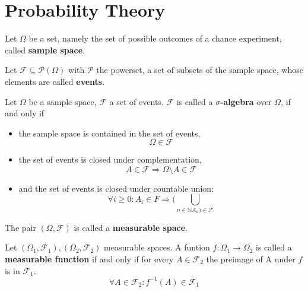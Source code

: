    \section{Probability Theory}\label{\positionnumber}
        \begin{definition}
        Let $\Omega$ be a set, namely the set of possible outcomes of a chance experiment, called \textbf{sample space}.
        
        Let $\mathcal{F} \subseteq \mathcal{P}(\Omega)$ with $\mathcal{P}$ the powerset, a set of subsets of the sample space, whose elements are called \textbf{events}.
        
        Let $\Omega$ be a sample space, $\mathcal{F}$ a set of events.
        $\mathcal{F}$ is called a \textbf{$\sigma$-algebra} over $\Omega$, if and only if
        \begin{itemize}
        \item the sample space is contained in the set of events,
        \[ \Omega \in \mathcal{F} \]
        \item the set of events is closed under complementation,
        \[ A \in \mathcal{F} \Rightarrow \Omega \setminus A \in \mathcal F \]
        \item and the set of events is closed under countable union:
        \[ \forall i \geq 0: A_i \in F \Rightarrow (\bigcup_{n \in \mathbb{N} A_n) \in \mathcal{F}} \]
        \end{itemize}
        
        The pair $\left( \Omega, \mathcal{F} \right)$ is called a \textbf{measurable space}.

        Let $\left( \Omega_1, \mathcal{F}_1 \right), \left( \Omega_2, \mathcal{F}_2 \right)$ measurable spaces. A funtion $f: \Omega_1 \rightarrow \Omega_2$ is called a \textbf{measurable function} if and only if for every $A \in \mathcal{F}_2$ the preimage of A under $f$ is in $\mathcal{F}_1$.
        \[ \forall A \in \mathcal{F}_2: f^{-1}(A) \in \mathcal{F}_1 \]
        \end{definition}

        \begin{definition}
            
        \end{definition}

        \begin{definition}
            
        \end{definition}
            
